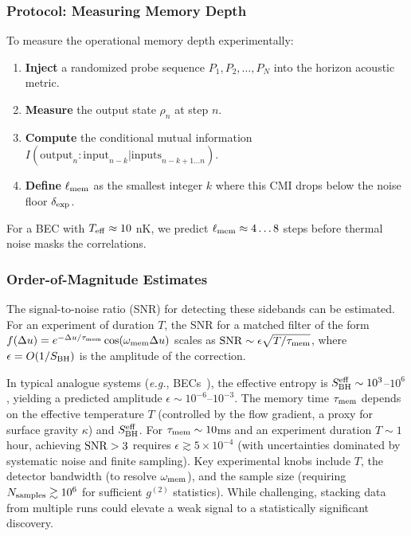 \documentclass[11pt,a4paper]{article}
\newcommand{\eg}{\textit{e.g.}\xspace}
\theoremstyle{plain}
\theoremstyle{definition}
\theoremstyle{remark}
\begin{document}
\subsubsection{Protocol: Measuring Memory Depth}
To measure the operational memory depth experimentally:
\begin{enumerate}
    \item \textbf{Inject} a randomized probe sequence $P_1, P_2, \dots, P_N$ into the horizon acoustic metric.
    \item \textbf{Measure} the output state $\rho_n$ at step $n$.
    \item \textbf{Compute} the conditional mutual information $I(\text{output}_n : \text{input}_{n-k} | \text{inputs}_{n-k+1 \dots n})$.
    \item \textbf{Define} $\ell_{\rm mem}$ as the smallest integer $k$ where this CMI drops below the noise floor $\delta_{\rm exp}$.
\end{enumerate}
For a BEC with $T_{\rm eff} \approx 10$ nK, we predict $\ell_{\rm mem} \approx 4\dots 8$ steps before thermal noise masks the correlations.

\subsubsection{Order-of-Magnitude Estimates}
The signal-to-noise ratio (SNR) for detecting these sidebands can be estimated. For an experiment of duration $T$, the SNR for a matched filter of the form $f(\Delta u) = e^{-\Delta u/\tau_{\rm mem}}\cos(\omega_{\rm mem}\Delta u)$ scales as ${\rm SNR}\sim \epsilon\sqrt{T/\tau_{\rm mem}}$, where $\epsilon=O(1/S_{\rm BH})$ is the amplitude of the correction.

In typical analogue systems (\eg, BECs~\cite{Steinhauer:2016}), the effective entropy is $S_{\rm BH}^{\rm eff} \sim 10^3$--$10^6$, yielding a predicted amplitude $\epsilon \sim 10^{-6}$--$10^{-3}$. The memory time $\tau_{\rm mem}$ depends on the effective temperature $T$ (controlled by the flow gradient, a proxy for surface gravity $\kappa$) and $S_{\rm BH}^{\rm eff}$. For $\tau_{\rm mem} \sim 10$ms and an experiment duration $T \sim 1$ hour, achieving ${\rm SNR} > 3$ requires $\epsilon \gtrsim 5\times 10^{-4}$ (with uncertainties dominated by systematic noise and finite sampling). Key experimental knobs include $T$, the detector bandwidth (to resolve $\omega_{\rm mem}$), and the sample size (requiring $N_{\rm samples} \gtrsim 10^6$ for sufficient $g^{(2)}$ statistics). While challenging, stacking data from multiple runs could elevate a weak signal to a statistically significant discovery.
\end{document}
